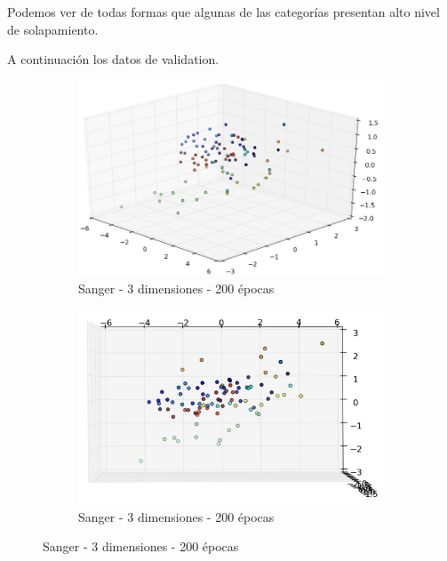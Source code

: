 Podemos ver de todas formas que algunas de las categorías presentan alto nivel de solapamiento.

A continuación los datos de validation.

\begin{figure}[!htbp]
\centering
\begin{subfigure}{.5\textwidth}
  \centering
  \includegraphics[width=1\linewidth, scale=1]{../img/ej1/sanger/sanger_3salida_200ep_validation.png}
  \caption{Sanger - 3 dimensiones - 200 épocas}
  \label{fig:sub1}
\end{subfigure}%
\begin{subfigure}{.5\textwidth}
  \centering
  \includegraphics[width=1\linewidth, scale=1]{../img/ej1/sanger/sanger_3salida_200ep_validation_3.png}
  \caption{Sanger - 3 dimensiones - 200 épocas}
  \label{fig:sub2}
\end{subfigure}
\end{figure}

